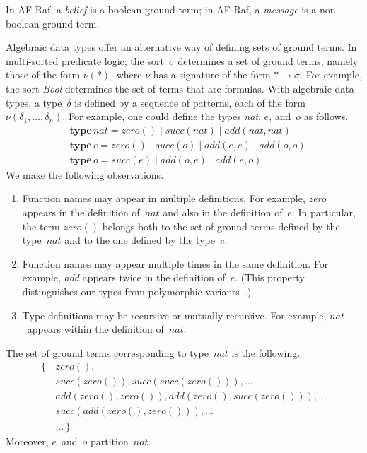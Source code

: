 \documentclass[a4paper,12pt,oneside,fleqn]{book} %
\newcommand{\rg}[1]{\marginpar{\tiny\raggedright\textcolor{blue}{\bf rg:} #1}}
\begin{document}
In AF-Raf, a \emph{belief} is a boolean ground term; in AF-Raf, a
\emph{message} is a non-boolean ground term.

Algebraic data types offer an alternative way of defining sets of ground
terms. In multi-sorted predicate logic, the sort~$\sigma$ determines a set
of ground terms, namely those of the form $\nu(*)$, where $\nu$ has a
signature of the form $*\to\sigma$.  For example, the sort \textit{Bool}
determines the set of terms that are formulas.  With algebraic data types,
a type~$\delta$ is defined by a sequence of patterns, each of the form
$\nu(\delta_1,\ldots,\delta_n)$. For example, one could define the types
\textit{nat}, $e$, and~$o$ as follows.
\begin{align}
&\mathbf{type}\,\mathit{nat} =
      \mathit{zero}()
  \mid\mathit{succ}(\mathit{nat})
  \mid\mathit{add}(\mathit{nat},\mathit{nat}) \\
&\mathbf{type}\,e =
      \mathit{zero}()
  \mid\mathit{succ}(o)
  \mid\mathit{add}(e,e)
  \mid\mathit{add}(o,o) \\
&\mathbf{type}\,o =
      \mathit{succ}(e)
  \mid\mathit{add}(o,e)
  \mid\mathit{add}(e,o)
\end{align}
We make the following observations.
\begin{enumerate}
\item
  Function names may appear in multiple definitions. For example,
  \textit{zero} appears in the definition of~$\mathit{nat}$ and also in the
  definition of~$e$. In particular, the term $\mathit{zero}()$ belongs both
  to the set of ground terms defined by the type~$\mathit{nat}$ and to the
  one defined by the type~$e$.
\item
  Function names may appear multiple times in the same definition. For
  example, \textit{add} appears twice in the definition of~$e$. (This
  property distinguishes our types from polymorphic
  variants~\cite{garrigue1998}.)
\item
  Type definitions may be recursive or mutually recursive. For example,
  $\mathit{nat}$~appears within the definition of~$\mathit{nat}$.
\end{enumerate}
The set of ground terms corresponding to type~$\mathit{nat}$ is the following.
\begin{equation}
\begin{aligned}
\{\,&\mathit{zero}(), \\
    &\mathit{succ}(\mathit{zero}()),
        \mathit{succ}(\mathit{succ}(\mathit{zero}())), \ldots \\
    &\mathit{add}(\mathit{zero}(), \mathit{zero}()),
        \mathit{add}(\mathit{zero}(), \mathit{succ}(\mathit{zero}())),
        \ldots \\
    &\mathit{succ}(\mathit{add}(\mathit{zero}(), \mathit{zero}())),
        \ldots \\
    &\ldots\, \}
\end{aligned}
\end{equation}
Moreover, $e$~and~$o$ partition~$\mathit{nat}$.
\end{document}
